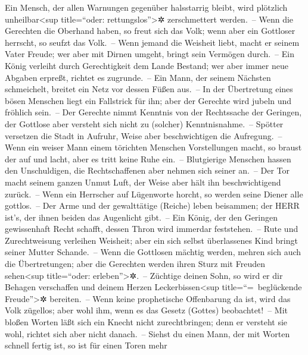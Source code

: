 Ein Mensch, der allen Warnungen gegenüber halsstarrig
bleibt, wird plötzlich unheilbar\textless sup title=``oder:
rettungslos''\textgreater✲ zerschmettert werden.~-- Wenn
die Gerechten die Oberhand haben, so freut sich das Volk; wenn aber ein
Gottloser herrscht, so seufzt das Volk.~-- Wenn jemand die
Weisheit liebt, macht er seinem Vater Freude; wer aber mit Dirnen
umgeht, bringt sein Vermögen durch.~-- Ein König verleiht
durch Gerechtigkeit dem Lande Bestand; wer aber immer neue Abgaben
erpreßt, richtet es zugrunde.~-- Ein Mann, der seinem
Nächsten schmeichelt, breitet ein Netz vor dessen Füßen aus.~--
In der Übertretung eines bösen Menschen liegt ein
Fallstrick für ihn; aber der Gerechte wird jubeln und fröhlich sein.~--
Der Gerechte nimmt Kenntnis von der Rechtssache der
Geringen, der Gottlose aber versteht sich nicht zu (solcher)
Kenntnisnahme.~-- Spötter versetzen die Stadt in Aufruhr,
Weise aber beschwichtigen die Aufregung.~-- Wenn ein
weiser Mann einem törichten Menschen Vorstellungen macht, so braust der
auf und lacht, aber es tritt keine Ruhe ein.~--
Blutgierige Menschen hassen den Unschuldigen, die
Rechtschaffenen aber nehmen sich seiner an.~-- Der Tor
macht seinem ganzen Unmut Luft, der Weise aber hält ihn beschwichtigend
zurück.~-- Wenn ein Herrscher auf Lügenworte horcht, so
werden seine Diener alle gottlos.~-- Der Arme und der
gewalttätige (Reiche) leben beisammen; der HERR ist's, der ihnen beiden
das Augenlicht gibt.~-- Ein König, der den Geringen
gewissenhaft Recht schafft, dessen Thron wird immerdar feststehen.~--
Rute und Zurechtweisung verleihen Weisheit; aber ein sich
selbst überlassenes Kind bringt seiner Mutter Schande.~--
Wenn die Gottlosen mächtig werden, mehren sich auch die
Übertretungen; aber die Gerechten werden ihren Sturz mit Freuden
sehen\textless sup title=``oder: erleben''\textgreater✲.~--
Züchtige deinen Sohn, so wird er dir Behagen verschaffen
und deinem Herzen Leckerbissen\textless sup title=``=~beglückende
Freude''\textgreater✲ bereiten.~-- Wenn keine
prophetische Offenbarung da ist, wird das Volk zügellos; aber wohl ihm,
wenn es das Gesetz (Gottes) beobachtet!~-- Mit bloßen
Worten läßt sich ein Knecht nicht zurechtbringen; denn er versteht sie
wohl, richtet sich aber nicht danach.~-- Siehst du einen
Mann, der mit Worten schnell fertig ist, so ist für einen Toren mehr
